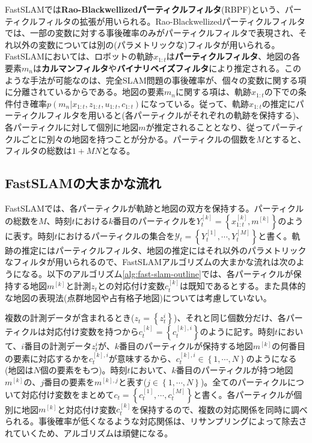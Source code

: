 \documentclass[dvipdfmx,a4paper]{jsarticle}
\begin{document}
FastSLAMでは\textbf{Rao-Blackwellizedパーティクルフィルタ}(RBPF)という、パーティクルフィルタの拡張が用いられる。Rao-Blackwellizedパーティクルフィルタでは、一部の変数に対する事後確率のみがパーティクルフィルタで表現され、それ以外の変数については別の(パラメトリックな)フィルタが用いられる。FastSLAMにおいては、ロボットの軌跡$x_{1 : t}$は\textbf{パーティクルフィルタ}、地図の各要素$m_n$は\textbf{カルマンフィルタ}や\textbf{バイナリベイズフィルタ}により推定される。このような手法が可能なのは、完全SLAM問題の事後確率が、個々の変数に関する項に分離されているからである。地図の要素$m_n$に関する項は、軌跡$x_{1 : t}$の下での条件付き確率$p(m_n | x_{1 : t}, z_{1 : t}, u_{1 : t}, c_{1 : t})$になっている。従って、軌跡$x_{1 : t}$の推定にパーティクルフィルタを用いると(各パーティクルがそれぞれの軌跡を保持する)、各パーティクルに対して個別に地図$m$が推定されることとなり、従ってパーティクルごとに別々の地図を持つことが分かる。パーティクルの個数を$M$とすると、フィルタの総数は$1 + MN$となる。

\subsection{FastSLAMの大まかな流れ}
FastSLAMでは、各パーティクルが軌跡と地図の双方を保持する。パーティクルの総数を$M$、時刻$t$における$k$番目のパーティクルを$Y_t^{[k]} = \left\{ x_{1 : t}^{[k]}, m^{[k]} \right\}$のように表す。時刻$t$におけるパーティクルの集合を$\mathcal{Y}_t = \left\{ Y_t^{[1]}, \cdots, Y_t^{[M]} \right\}$と書く。軌跡の推定にはパーティクルフィルタ、地図の推定にはそれ以外のパラメトリックなフィルタが用いられるので、FastSLAMアルゴリズムの大まかな流れは次のようになる。以下のアルゴリズム\ref{alg:fast-slam-outline}では、各パーティクルが保持する地図$m^{[k]}$と計測$z_t$との対応付け変数$c_t^{[k]}$は既知であるとする。また具体的な地図の表現法(点群地図や占有格子地図)については考慮していない。\newline

複数の計測データが含まれるとき($z_t = \left\{ z_t^i \right\}$)、それと同じ個数分だけ、各パーティクルは対応付け変数を持つから$c_t^{[k]} = \left\{ c_t^{[k], i} \right\}$のように記す。時刻$t$において、$i$番目の計測データ$z_t^i$が、$k$番目のパーティクルが保持する地図$m^{[k]}$の何番目の要素に対応するかを$c_t^{[k], i}$が意味するから、$c_t^{[k], i} \in \left\{ 1, \cdots, N \right\}$のようになる(地図は$N$個の要素をもつ)。時刻$t$において、$k$番目のパーティクルが持つ地図$m^{[k]}$の、$j$番目の要素を$m^{[k], j}$と表す($j \in \left\{ 1, \cdots, N \right\}$)。全てのパーティクルについて対応付け変数をまとめて$c_t = \left\{ c_t^{[1]}, \cdots, c_t^{[M]} \right\}$と書く。各パーティクルが個別に地図$m^{[k]}$と対応付け変数$c_t^{[k]}$を保持するので、複数の対応関係を同時に調べられる。事後確率が低くなるような対応関係は、リサンプリングによって除去されていくため、アルゴリズムは頑健になる。
\end{document}
